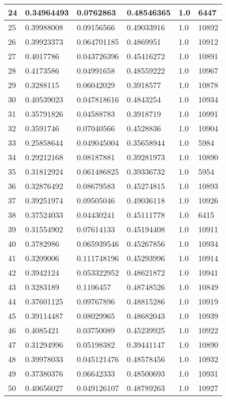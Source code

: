\begin{longtable}{|l|l|l|l|l|l|}
24 & 0.34964493 & 0.0762863 & 0.48546365 & 1.0 & 6447 \\ \hline 
25 & 0.39988008 & 0.09156566 & 0.49033916 & 1.0 & 10892 \\ \hline 
26 & 0.39923373 & 0.064701185 & 0.4869951 & 1.0 & 10912 \\ \hline 
27 & 0.4017786 & 0.043726396 & 0.45416272 & 1.0 & 10891 \\ \hline 
28 & 0.4173586 & 0.04991658 & 0.48559222 & 1.0 & 10967 \\ \hline 
29 & 0.3288115 & 0.06042029 & 0.3918577 & 1.0 & 10878 \\ \hline 
30 & 0.40539023 & 0.047818616 & 0.4843254 & 1.0 & 10934 \\ \hline 
31 & 0.35791826 & 0.04588783 & 0.3918719 & 1.0 & 10991 \\ \hline 
32 & 0.3591746 & 0.07040566 & 0.4528836 & 1.0 & 10904 \\ \hline 
33 & 0.25858644 & 0.049045004 & 0.35658944 & 1.0 & 5984 \\ \hline 
34 & 0.29212168 & 0.08187881 & 0.39281973 & 1.0 & 10890 \\ \hline 
35 & 0.31812924 & 0.061486825 & 0.39336732 & 1.0 & 5954 \\ \hline 
36 & 0.32876492 & 0.08679583 & 0.45274815 & 1.0 & 10893 \\ \hline 
37 & 0.39251974 & 0.09505046 & 0.49036118 & 1.0 & 10926 \\ \hline 
38 & 0.37524033 & 0.04430241 & 0.45111778 & 1.0 & 6415 \\ \hline 
39 & 0.31554902 & 0.07614133 & 0.45194408 & 1.0 & 10911 \\ \hline 
40 & 0.3782986 & 0.065939546 & 0.45267856 & 1.0 & 10934 \\ \hline 
41 & 0.3209006 & 0.111748196 & 0.45293996 & 1.0 & 10914 \\ \hline 
42 & 0.3942124 & 0.053322952 & 0.48621872 & 1.0 & 10941 \\ \hline 
43 & 0.3283189 & 0.1106457 & 0.48748526 & 1.0 & 10849 \\ \hline 
44 & 0.37601125 & 0.09767896 & 0.48815286 & 1.0 & 10919 \\ \hline 
45 & 0.39114487 & 0.08029965 & 0.48682043 & 1.0 & 10939 \\ \hline 
46 & 0.4085421 & 0.03750089 & 0.45239925 & 1.0 & 10922 \\ \hline 
47 & 0.31294996 & 0.05198382 & 0.39441147 & 1.0 & 10890 \\ \hline 
48 & 0.39978033 & 0.045121476 & 0.48578456 & 1.0 & 10932 \\ \hline 
49 & 0.37380376 & 0.06642333 & 0.48500693 & 1.0 & 10931 \\ \hline 
50 & 0.40656027 & 0.049126107 & 0.48789263 & 1.0 & 10927 \\ \hline 
\end{longtable}